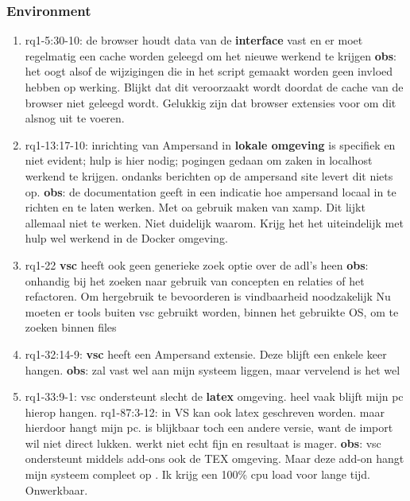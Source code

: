 \subsubsection{Environment}
\begin{comment}
plaats hier de afgehandelde items.
\end{comment}
\begin{enumerate}
    \item rq1-5:30-10: de browser houdt data van de \textbf{interface} vast en er moet regelmatig een cache worden geleegd om het nieuwe werkend te krijgen
    \newline\textbf{obs}: het oogt alsof de wijzigingen die in het script gemaakt worden geen invloed hebben op werking. 
    Blijkt dat dit veroorzaakt wordt doordat de cache van de browser niet geleegd wordt.
    Gelukkig zijn dat browser extensies voor om dit alsnog uit te voeren.
    
    \item rq1-13:17-10: inrichting van Ampersand in \textbf{lokale omgeving} is specifiek en niet evident; hulp is hier nodig; pogingen gedaan om zaken in localhost werkend te krijgen. ondanks berichten op de ampersand site levert dit niets op.
    \newline\textbf{obs}: de documentation geeft in een indicatie hoe ampersand locaal in te richten en te laten werken.
    Met oa gebruik maken van xamp. 
    Dit lijkt allemaal niet te werken. Niet duidelijk waarom.
    Krijg het het uiteindelijk met hulp wel werkend in de Docker omgeving.
    
    \item rq1-22 \textbf{\acrshort{vsc}} heeft ook geen generieke zoek optie over de adl's heen
    \newline\textbf{obs}: onhandig bij het zoeken naar gebruik van concepten en relaties of het refactoren.
    Om hergebruik te bevoorderen is vindbaarheid noodzakelijk
    Nu moeten er tools buiten \acrshort{vsc} gebruikt worden, binnen het gebruikte OS, om te zoeken binnen files
    
    \item rq1-32:14-9: \textbf{\acrfull{vsc}} heeft een Ampersand extensie. Deze blijft een enkele keer hangen.
    \newline\textbf{obs}: zal vast wel aan mijn systeem liggen, maar vervelend is het wel
    
    \item rq1-33:9-1: \acrshort{vsc} ondersteunt slecht de \textbf{latex} omgeving. heel vaak blijft mijn pc hierop hangen.  
    \newline rq1-87:3-12: in VS kan ook latex geschreven worden. maar hierdoor hangt mijn pc. is blijkbaar toch een andere versie, want de import wil niet direct lukken. werkt niet echt fijn en resultaat is mager. 
    \newline\textbf{obs}: \acrlong{vsc} ondersteunt middels add-ons ook de TEX omgeving. 
    Maar deze add-on hangt mijn systeem compleet op .
    Ik krijg een 100\% cpu load voor lange tijd. Onwerkbaar.
    

\end{enumerate}
